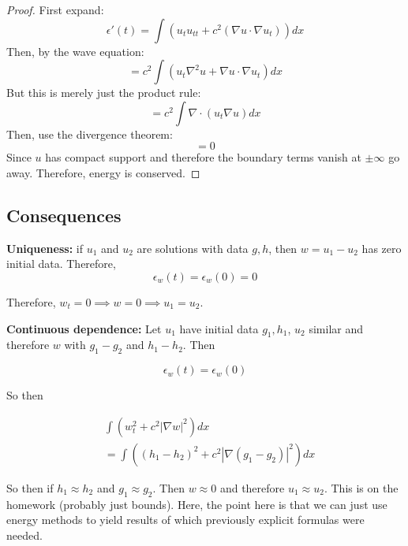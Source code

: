 \documentclass{article}
\newtheorem{one minute paper}[theorem]{One Minute Paper}
\begin{document}
\begin{proof}
    First expand:
    \begin{equation}
        \epsilon'(t) = \int (u_t u_{tt} + c^2(\nabla u \cdot \nabla u_t) )dx
    \end{equation}
    Then, by the wave equation:
    \begin{equation}
        = c^2\int (u_t \nabla^2 u + \nabla u \cdot \nabla u_t)dx
    \end{equation}
    But this is merely just the product rule:
    \begin{equation}
        = c^2 \int \nabla \cdot \left(u_t \nabla u \right)dx
    \end{equation}
    Then, use the divergence theorem:
    \begin{equation}
        = 0 
    \end{equation}
    Since $u$ has compact support and therefore the boundary terms vanish at $\pm \infty$ go away. Therefore, energy is conserved. 
\end{proof}

\subsection*{Consequences}

\textbf{Uniqueness: }if $u_1$ and $u_2$ are solutions with data $g,h$, then $w = u_1 - u_2$ has zero initial data. Therefore,
\begin{equation}
    \epsilon_w(t) = \epsilon_w(0) = 0
\end{equation}

Therefore, $w_t = 0 \implies w = 0 \implies u_1 = u_2$.

\textbf{Continuous dependence: } Let $u_1$ have initial data $g_1,h_1$, $u_2$ similar and therefore $w$ with $g_1 - g_2$ and $h_1 - h_2$. Then 

\begin{equation}
    \epsilon_w(t) = \epsilon_w(0)
\end{equation}

So then

\begin{align*}
    &\int\left( w_t^2 + c^2|\nabla w|^2 \right)dx \\
    &= \int\left( (h_1 - h_2)^2 + c^2|\nabla (g_1 - g_2)|^2 \right)dx
\end{align*}

So then if $h_1 \approx h_2$ and $g_1 \approx g_2$. Then $w \approx 0$ and therefore $u_1 \approx u_2$. This is on the homework (probably just bounds). Here, the point here is that 
we can just use energy methods to yield results of which previously explicit formulas were needed. 
\end{document}
